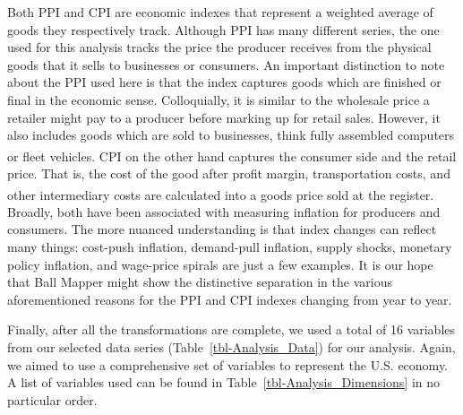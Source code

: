 \documentclass[10pt, letterpaper]{article}
\begin{document}
Both PPI and CPI are economic indexes that represent a weighted average
of goods they respectively track. Although PPI has many different
series, the one used for this analysis tracks the price the producer
receives from the physical goods that it sells to businesses or
consumers. An important distinction to note about the PPI used here is
that the index captures goods which are finished or final in the
economic sense. Colloquially, it is similar to the wholesale price a
retailer might pay to a producer before marking up for retail sales.
However, it also includes goods which are sold to businesses, think
fully assembled computers or fleet
vehicles.\textsuperscript{}
CPI on the other hand captures the consumer side and the retail price.
That is, the cost of the good after profit margin, transportation costs,
and other intermediary costs are calculated into a goods price sold at
the
register.\textsuperscript{}
Broadly, both have been associated with measuring inflation for
producers and consumers. The more nuanced understanding is that index
changes can reflect many things: cost-push inflation, demand-pull
inflation, supply shocks, monetary policy inflation, and wage-price
spirals are just a few examples. It is our hope that Ball Mapper might
show the distinctive separation in the various aforementioned reasons
for the PPI and CPI indexes changing from year to year.

Finally, after all the transformations are complete, we used a total of
16 variables from our selected data series
(Table~\ref{tbl-Analysis_Data}) for our analysis. Again, we aimed to use
a comprehensive set of variables to represent the U.S. economy. A list
of variables used can be found in Table~\ref{tbl-Analysis_Dimensions} in
no particular order.

\begin{table}[H]


\caption{\label{tbl-Analysis_Dimensions}Variables inculde in Ball Mapper
Point Cloud}

\end{table}%
\end{document}
